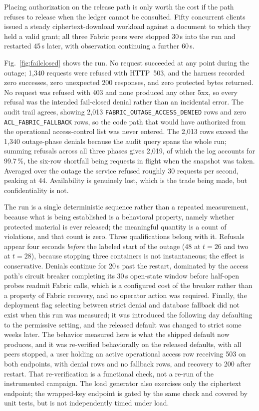 \documentclass[preprint,12pt]{elsarticle}
\begin{document}
Placing authorization on the release path is only worth the cost if the path
refuses to release when the ledger cannot be consulted. Fifty concurrent clients
issued a steady ciphertext-download workload against a document to which they
held a valid grant; all three Fabric peers were stopped 30\,s into the run and
restarted 45\,s later, with observation continuing a further 60\,s.

Fig.~\ref{fig:failclosed} shows the run. No request succeeded at any point
during the outage; 1{,}340 requests were refused with HTTP~503, and the harness
recorded zero successes, zero unexpected 200 responses, and zero protected
bytes returned. No request was refused with
403 and none produced any other 5xx, so every refusal was the intended
fail-closed denial rather than an incidental error. The audit trail agrees, showing 2{,}013
\texttt{FABRIC\_\allowbreak OUTAGE\_\allowbreak ACCESS\_\allowbreak DENIED}
rows and zero \texttt{ACL\_\allowbreak FABRIC\_\allowbreak FALLBACK} rows,
so the code path that would have authorized from the operational
access-control list was never entered. The 2{,}013 rows exceed the 1{,}340
outage-phase denials because the audit query spans the whole run; summing
refusals across all three phases gives 2{,}019, of which the log accounts for
99.7\,\%, the six-row shortfall being requests in flight when the snapshot
was taken. Averaged over the outage the service refused roughly 30
requests per second, peaking at 44. Availability is genuinely lost, which is
the trade being made, but confidentiality is not.

The run is a single deterministic sequence rather than a repeated
measurement, because what is being established is a behavioral property,
namely whether protected material is ever released; the meaningful quantity is
a count of violations, and that count is zero. Three qualifications belong with it. Refusals appear four seconds
\emph{before} the labeled start of the outage (48 at $t=26$ and two at
$t=28$), because stopping three containers is not instantaneous; the effect is
conservative. Denials continue for 20\,s past the restart, dominated by the
access path's circuit breaker completing its 30\,s open-state window before
half-open probes readmit Fabric calls, which is a configured cost of the breaker
rather than a property of Fabric recovery, and no operator action was required.
Finally, the deployment flag selecting between strict denial and database
fallback did not exist when this run was measured; it was introduced the
following day defaulting to the permissive setting, and the released default
was changed to strict some weeks later. The behavior measured here is what the
shipped default now produces, and it was re-verified behaviorally on the
released defaults, with all peers stopped, a user holding an active operational
access row receiving 503 on both endpoints, with denial rows and no fallback
rows, and recovery to 200 after restart. That re-verification is a functional check, not a re-run of the
instrumented campaign. The load generator also
exercises only the ciphertext endpoint; the wrapped-key endpoint is gated by the
same check and covered by unit tests, but is not independently timed under load.
\end{document}
